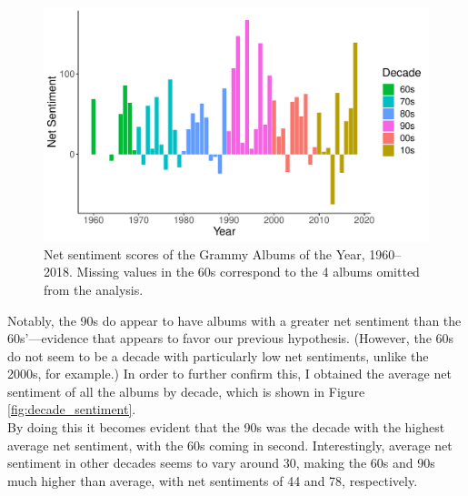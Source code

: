\documentclass{article}
\begin{document}
\begin{figure}[h]
    \centering
    \includegraphics[scale=0.5]{Plots/graph_annual_sentiment.pdf}
    \caption{Net sentiment scores of the Grammy Albums of the Year, 1960--2018. Missing values in the 60s correspond to the 4 albums omitted from the analysis.}
    \label{fig:annual_sentiment}
\end{figure}




\newpage

Notably, the 90s do appear to have albums with a greater net sentiment than the 60s'---evidence that appears to favor our previous hypothesis. (However, the 60s do not seem to be a decade with particularly low net sentiments, unlike the 2000s, for example.) In order to further confirm this, I obtained the average net sentiment of all the albums by decade, which is shown in Figure \ref{fig:decade_sentiment}. \\


By doing this it becomes evident that the 90s was the decade with the highest average net sentiment, with the 60s coming in second. Interestingly, average net sentiment in other decades seems to vary around 30, making the 60s and 90s much higher than average, with net sentiments of 44 and 78, respectively.
\end{document}
